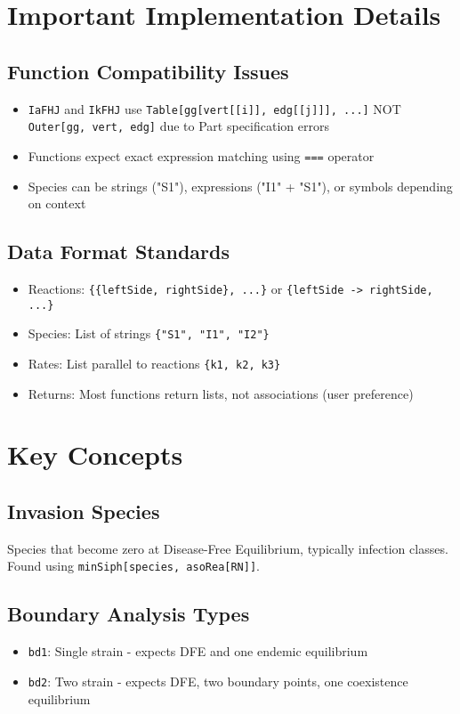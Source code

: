 \documentclass{article}
\begin{document}
\section{Important Implementation Details}

\subsection{Function Compatibility Issues}
\begin{itemize}
\item \texttt{IaFHJ} and \texttt{IkFHJ} use \texttt{Table[gg[vert[[i]], edg[[j]]], ...]} NOT \texttt{Outer[gg, vert, edg]} due to Part specification errors
\item Functions expect exact expression matching using \texttt{===} operator
\item Species can be strings ("S1"), expressions ("I1" + "S1"), or symbols depending on context
\end{itemize}

\subsection{Data Format Standards}
\begin{itemize}
\item Reactions: \texttt{\{\{leftSide, rightSide\}, ...\}} or \texttt{\{leftSide -> rightSide, ...\}}
\item Species: List of strings \texttt{\{"S1", "I1", "I2"\}}
\item Rates: List parallel to reactions \texttt{\{k1, k2, k3\}}
\item Returns: Most functions return lists, not associations (user preference)
\end{itemize}

\section{Key Concepts}

\subsection{Invasion Species}
Species that become zero at Disease-Free Equilibrium, typically infection classes. Found using \texttt{minSiph[species, asoRea[RN]]}.

\subsection{Boundary Analysis Types}
\begin{itemize}
\item \texttt{bd1}: Single strain - expects DFE and one endemic equilibrium
\item \texttt{bd2}: Two strain - expects DFE, two boundary points, one coexistence equilibrium
\end{itemize}
\end{document}
